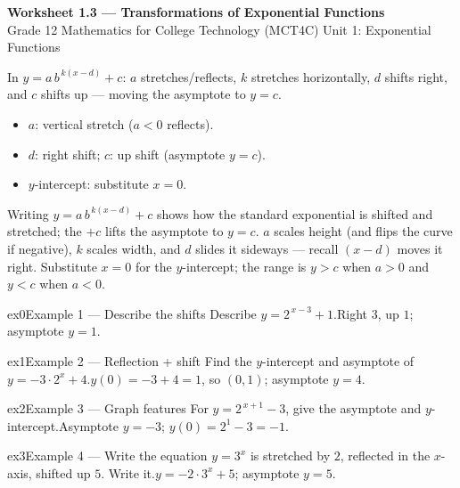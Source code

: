 \documentclass[11pt]{article}
\begin{document}
\begin{center}
{\LARGE\bfseries\color{titleblue}Worksheet 1.3 --- Transformations of Exponential Functions}\\[2pt]
{\small Grade 12 Mathematics for College Technology (MCT4C) \textperiodcentered{} Unit 1: Exponential Functions}
\end{center}

\begin{ideabox}
In $y=a\,b^{\,k(x-d)}+c$: $a$ stretches/reflects, $k$ stretches horizontally, $d$ shifts right, and $c$ shifts up — moving the asymptote to $y=c$.
\begin{itemize}[leftmargin=*,itemsep=2pt]
  \item $a$: vertical stretch ($a<0$ reflects).
  \item $d$: right shift; $c$: up shift (asymptote $y=c$).
  \item $y$-intercept: substitute $x=0$.
\end{itemize}
\end{ideabox}

\begin{learnbox}
Writing $y=a\,b^{\,k(x-d)}+c$ shows how the standard exponential is shifted and stretched; the $+c$ lifts the asymptote to $y=c$.
$a$ scales height (and flips the curve if negative), $k$ scales width, and $d$ slides it sideways — recall $(x-d)$ moves it right.
Substitute $x=0$ for the $y$-intercept; the range is $y>c$ when $a>0$ and $y<c$ when $a<0$.
\end{learnbox}


\begin{example}{ex0}{Example 1 --- Describe the shifts}
Describe $y=2^{\,x-3}+1$.\soln Right $3$, up $1$; asymptote $y=1$.
\end{example}

\begin{example}{ex1}{Example 2 --- Reflection + shift}
Find the $y$-intercept and asymptote of $y=-3\cdot2^{x}+4$.\soln $y(0)=-3+4=1$, so $(0,1)$; asymptote $y=4$.
\end{example}

\begin{example}{ex2}{Example 3 --- Graph features}
For $y=2^{\,x+1}-3$, give the asymptote and $y$-intercept.\soln Asymptote $y=-3$; $y(0)=2^1-3=-1$.
\end{example}

\begin{example}{ex3}{Example 4 --- Write the equation}
$y=3^{x}$ is stretched by $2$, reflected in the $x$-axis, shifted up $5$. Write it.\soln $y=-2\cdot3^{x}+5$; asymptote $y=5$.
\end{example}
\end{document}
